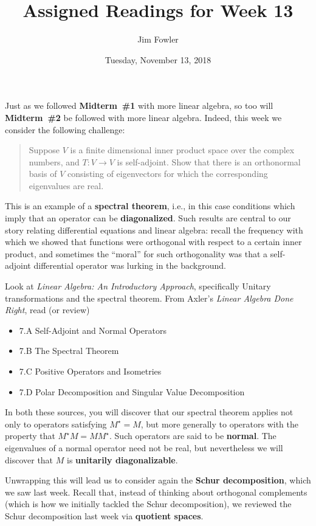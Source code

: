 \documentclass{homework}
\author{Jim Fowler}
\title{Assigned Readings for Week 13}
\date{Tuesday, November 13, 2018}
\begin{document}
\maketitle

Just as we followed \textbf{Midterm~\#1} with more linear algebra, so
too will \textbf{Midterm~\#2} be followed with more linear algebra.
Indeed, this week we consider the following challenge:
\begin{quote}
  Suppose $V$ is a finite dimensional inner product space over the
  complex numbers, and $T : V \to V$ is self-adjoint.  Show that there
  is an orthonormal basis of $V$ consisting of eigenvectors for which
  the corresponding eigenvalues are real.
\end{quote}
This is an example of a \textbf{spectral theorem}, i.e., in this case
conditions which imply that an operator can be \textbf{diagonalized}.
Such results are central to our story relating differential
equations and linear algebra: recall the frequency with which we
showed that functions were orthogonal with respect to a certain inner
product, and sometimes the ``moral'' for such orthogonality was that a
self-adjoint differential operator was lurking in the background.

Look at \textit{Linear Algebra: An
  Introductory Approach}, specifically  Unitary transformations and the spectral theorem.
From Axler's \textit{Linear Algebra Done Right}, read (or review)
\begin{itemize}
\item \textsection 7.A Self-Adjoint and Normal Operators
\item \textsection 7.B The Spectral Theorem
\item \textsection 7.C Positive Operators and Isometries
\item \textsection 7.D Polar Decomposition and Singular Value Decomposition
\end{itemize}

In both these sources, you will discover that our spectral theorem
applies not only to operators satisfying $M^\star = M$, but more
generally to operators with the property that $M^\star M = M M^\star$.
Such operators are said to be \textbf{normal}.  The eigenvalues of a
normal operator need not be real, but nevertheless we will discover
that $M$ is \textbf{unitarily diagonalizable}.

Unwrapping this will lead us to consider again the \textbf{Schur
  decomposition}, which we saw last week.  Recall that, instead of
thinking about orthogonal complements (which is how we initially
tackled the Schur decomposition), we reviewed the Schur decomposition
last week via \textbf{quotient spaces}.
\end{document}
